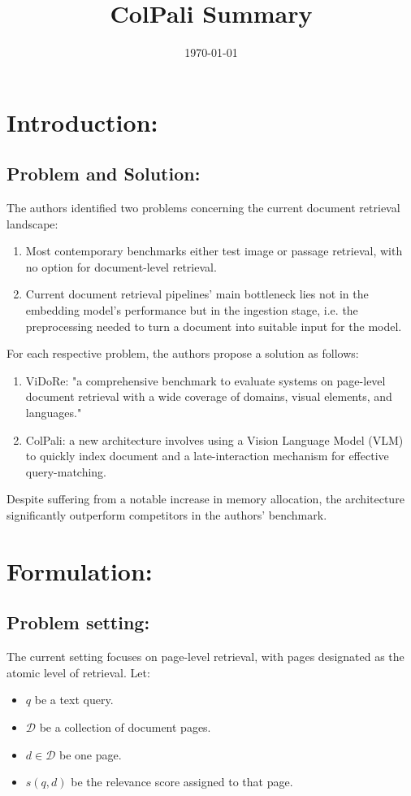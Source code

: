 \documentclass[11pt,a4paper]{article}
\title{ColPali Summary}
\date{\today}
\begin{document}
\maketitle

\section{Introduction:}
\subsection{Problem and Solution:}
The authors identified two problems concerning the current document retrieval landscape:
\begin{enumerate}
    \item Most contemporary benchmarks either test image or passage retrieval, with no option for document-level retrieval.
    \item Current document retrieval pipelines' main bottleneck lies not in the embedding model's performance but in the ingestion stage, i.e. the preprocessing needed to turn a document into suitable input for the model.
\end{enumerate}
For each respective problem, the authors propose a solution as follows:
\begin{enumerate}
    \item ViDoRe: "a comprehensive benchmark to evaluate systems on page-level document retrieval with a wide coverage of domains, visual elements, and languages."
    \item ColPali: a new architecture involves using a Vision Language Model (VLM) to quickly index document and a late-interaction mechanism for effective query-matching. 
\end{enumerate}
Despite suffering from a notable increase in memory allocation, the architecture significantly outperform competitors in the authors' benchmark.

\section{Formulation:}
\subsection{Problem setting:}
The current setting focuses on page-level retrieval, with pages designated as the atomic level of retrieval. Let:
\begin{itemize}
\item \(q\) be a text query.
\item \(\mathcal{D}\) be a collection of document pages.
\item \(d\in\mathcal{D}\) be one page.
\item \(s(q,d)\) be the relevance score assigned to that page.
\end{itemize}
\end{document}
